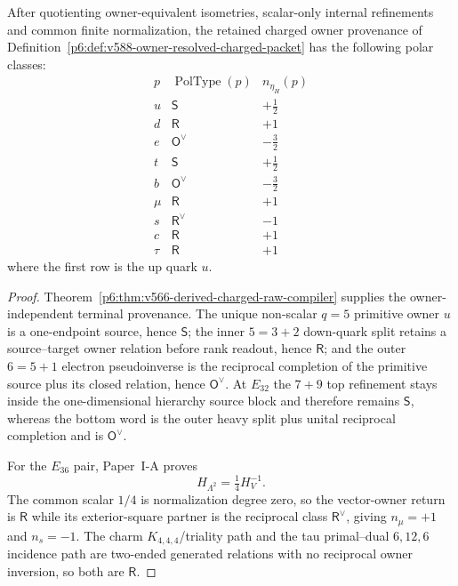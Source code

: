 \documentclass[12pt,a4paper]{article}
\begin{document}
\begin{theorem}
\label{p6:thm:v591-owner-provenance-charged-grades}
After quotienting owner-equivalent isometries, scalar-only internal refinements
and common finite normalization, the retained charged owner provenance of
Definition~\ref{p6:def:v588-owner-resolved-charged-packet} has the following
polar classes:
\[
\boxed{
\begin{array}{c|c|c}
p&\operatorname{PolType}(p)&n_{\eta_H}(p)\\\hline
 u&\mathsf S&+\tfrac12\\
d&\mathsf R&+1\\
e&\mathsf O^\vee&-\tfrac32\\
t&\mathsf S&+\tfrac12\\
b&\mathsf O^\vee&-\tfrac32\\
\mu&\mathsf R&+1\\
s&\mathsf R^\vee&-1\\
c&\mathsf R&+1\\
\tau&\mathsf R&+1
\end{array}}
\]
where the first row is the up quark $u$.
\end{theorem}
\begin{proof}
Theorem~\ref{p6:thm:v566-derived-charged-raw-compiler} supplies the
owner-independent terminal provenance.  The unique non-scalar $q=5$
primitive owner $u$ is a one-endpoint source, hence $\mathsf S$; the inner
$5=3+2$ down-quark split retains a source--target owner relation before rank
readout, hence $\mathsf R$; and the outer $6=5+1$ electron pseudoinverse is the
reciprocal completion of the primitive source plus its closed relation, hence
$\mathsf O^\vee$.  At $E_{32}$ the $7+9$ top refinement stays inside the
one-dimensional hierarchy source block and therefore remains $\mathsf S$,
whereas the bottom word is the outer heavy split plus unital reciprocal
completion and is $\mathsf O^\vee$.

For the $E_{36}$ pair, Paper~I-A proves
\[
 H_{\Lambda^2}=\tfrac14H_V^{-1}.
\]
The common scalar $1/4$ is normalization degree zero, so the vector-owner
return is $\mathsf R$ while its exterior-square partner is the reciprocal
class $\mathsf R^\vee$, giving $n_\mu=+1$ and $n_s=-1$.  The charm
$K_{4,4,4}$/triality path and the tau primal--dual $6,12,6$ incidence path are
two-ended generated relations with no reciprocal owner inversion, so both are
$\mathsf R$.
\end{proof}
\end{document}
